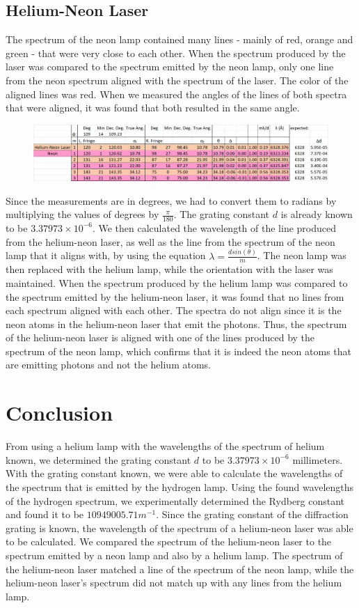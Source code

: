\documentclass[a4paper]{article}
\begin{document}
\subsection{Helium-Neon Laser}
The spectrum of the neon lamp contained many lines - mainly of red, orange and green - that were very close to each other. When the spectrum produced by the laser was compared to the spectrum emitted by the neon lamp, only one line from the neon spectrum aligned with the spectrum of the laser. The color of the aligned lines was red. When we measured the angles of the lines of both spectra that were aligned, it was found that both resulted in the same angle.
\begin{figure}[h]
\centering
\includegraphics[width=1.0\textwidth]{laser}
\end{figure}
Since the measurements are in degrees, we had to convert them to radians by multiplying the values of degrees by $\frac{\pi}{180}$. The grating constant $d$ is already known to be $3.37973\times 10^{-6}$. We then calculated the wavelength of the line produced from the helium-neon laser, as well as the line from the spectrum of the neon lamp that it aligns with, by using the equation $\lambda = \frac{dsin(\theta)}{m}$. The neon lamp was then replaced with the helium lamp, while the orientation with the laser was maintained. When the spectrum produced by the helium lamp was compared to the spectrum emitted by the helium-neon laser, it was found that no lines from each spectrum aligned with each other. The spectra do not align since it is the neon atoms in the helium-neon laser that emit the photons. Thus, the spectrum of the helium-neon laser is aligned with one of the lines produced by the spectrum of the neon lamp, which confirms that it is indeed the neon atoms that are emitting photons and not the helium atoms.

\section{Conclusion}
From using a helium lamp with the wavelengths of the spectrum of helium known, we determined the grating constant $d$ to be $3.37973\times 10^{-6}$ millimeters. With the grating constant known, we were able to calculate the wavelengths of the spectrum that is emitted by the hydrogen lamp. Using the found wavelengths of the hydrogen spectrum, we experimentally determined the Rydberg constant and found it to be $10949005.71m^{-1}$. Since the grating constant of the diﬀraction grating is known, the wavelength of the spectrum of a helium-neon laser was able to be calculated. We compared the spectrum of the helium-neon laser to the spectrum emitted by a neon lamp and also by a helium lamp. The spectrum of the helium-neon laser matched a line of the spectrum of the neon lamp, while the helium-neon laser’s spectrum did not match up with any lines from the helium lamp.
\end{document}
